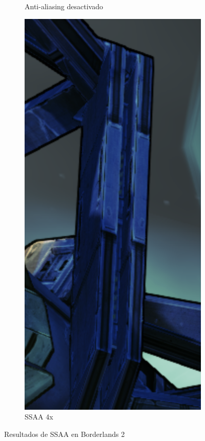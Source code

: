 \documentclass[withindex, glossary]{cam-thesis}
\begin{document}
\begin{figure}[!htbp]
\begin{subfigure}[b]{0.3\textwidth}
        \caption{Anti-aliasing desactivado}
    \end{subfigure}
    \begin{subfigure}[b]{0.3\textwidth}
        \includegraphics[width=\textwidth]{figures/ss2on.png}
        \caption{SSAA 4x}
    \end{subfigure}
    \caption{Resultados de SSAA en Borderlands 2\label{ss2}}
\end{figure}
\end{document}
